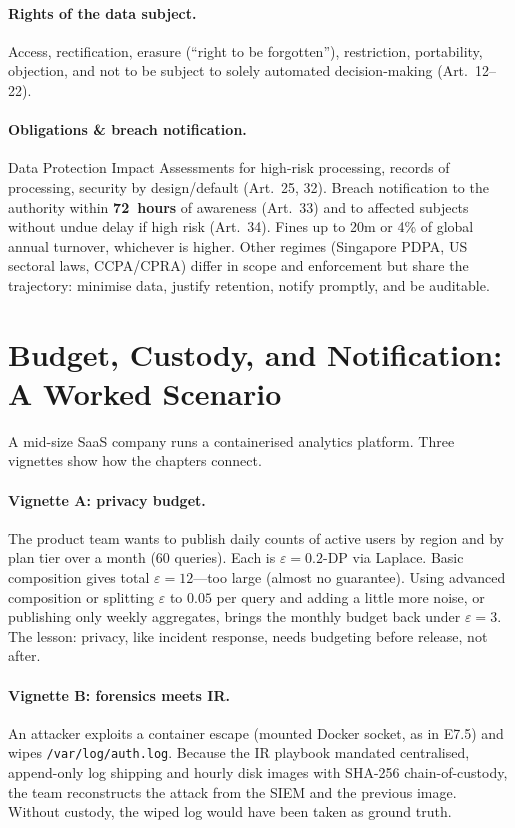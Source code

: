 \paragraph{Rights of the data subject.} Access, rectification, erasure (``right to be forgotten''), restriction, portability, objection, and not to be subject to solely automated decision-making (Art.~12--22).
\paragraph{Obligations \& breach notification.} Data Protection Impact Assessments for high-risk processing, records of processing, security by design/default (Art.~25, 32). Breach notification to the authority within \textbf{72~hours} of awareness (Art.~33) and to affected subjects without undue delay if high risk (Art.~34). Fines up to \texteuro20m or 4\% of global annual turnover, whichever is higher.
Other regimes (Singapore PDPA, US sectoral laws, CCPA/CPRA) differ in scope and enforcement but share the trajectory: minimise data, justify retention, notify promptly, and be auditable.
\section{Budget, Custody, and Notification: A Worked Scenario}
\label{sec:putting-together}
A mid-size SaaS company runs a containerised analytics platform. Three vignettes show how the chapters connect.
\paragraph{Vignette A: privacy budget.} The product team wants to publish daily counts of active users by region and by plan tier over a month (60 queries). Each is $\varepsilon=0.2$-DP via Laplace. Basic composition gives total $\varepsilon=12$---too large (almost no guarantee). Using advanced composition or splitting $\varepsilon$ to $0.05$ per query and adding a little more noise, or publishing only weekly aggregates, brings the monthly budget back under $\varepsilon=3$. The lesson: privacy, like incident response, needs budgeting before release, not after.
\paragraph{Vignette B: forensics meets IR.} An attacker exploits a container escape (mounted Docker socket, as in E7.5) and wipes \texttt{/var/log/auth.log}. Because the IR playbook mandated centralised, append-only log shipping and hourly disk images with SHA-256 chain-of-custody, the team reconstructs the attack from the SIEM and the previous image. Without custody, the wiped log would have been taken as ground truth.
